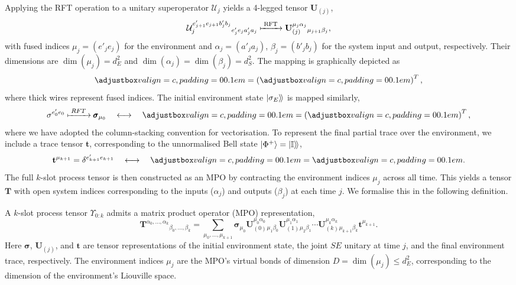 Applying the RFT operation to a unitary superoperator \(\mathcal{U}_j\) yields a 4-legged tensor \(\mathbf{U}_{(j)}\),
\begin{equation}
    \mathcal{U}_j^{e'_{j+1} e_{j+1} b'_j b_j}{}_{e'_j e_j a'_j a_j} \xmapsto{\;\mathrm{RFT}\;} \mathbf{U}_{(j)}^{\mu_j \alpha_j}{}_{\mu_{j+1} \beta_j},
\end{equation}
with fused indices \(\mu_j = (e'_j e_j)\) for the environment and \(\alpha_j=(a'_j a_j)\), \(\beta_j=(b'_j b_j)\) for the system input and output, respectively. Their dimensions are \(\dim(\mu_j) = d_E^2\) and \(\dim(\alpha_j) = \dim(\beta_j) = d_S^2\). The mapping is graphically depicted as
\begin{equation}
    \valignbox{}
    = 
    \left(\valignbox{}\right)^T,
\end{equation}
where thick wires represent fused indices. The initial environment state \(| \sigma_E \rangle \! \rangle\) is mapped similarly,
\begin{equation}
    \sigma^{e'_0e_0} \xmapsto {\;RFT\;} \pmb{\sigma}_{\mu_0} 
    \quad\longleftrightarrow\quad
    \valignbox{} = \left(\valignbox{}\right)^T,
\end{equation}
where we have adopted the column-stacking convention for vectorisation. To represent the final partial trace over the environment, we include a trace tensor \(\mathbf{t}\), corresponding to the unnormalised Bell state \(\ket{\Phi^+} = | \mathbb{I} \rangle \! \rangle\),
\begin{equation}
    \mathbf{t}^{\mu_{k+1}} = \delta^{e'_{k+1}e_{k+1}}
    \quad\longleftrightarrow\quad
    \valignbox{} = \valignbox{}.
\end{equation}
The full \(k\)-slot process tensor is then constructed as an MPO by contracting the environment indices \(\mu_j\) across all time. This yields a tensor \(\mathbf{T}\) with open system indices corresponding to the inputs (\(\alpha_j\)) and outputs (\(\beta_j\)) at each time \(j\). We formalise this in the following definition.
\begin{definition}\label{def:pt-mpo}
A $k$-slot process tensor $\Upsilon_{0:k}$ admits a matrix product operator (MPO) representation,
\begin{equation}\label{eq:pt-mpo}
    \mathbf{T}^{\alpha_0,\dots,\alpha_k}{}_{\beta_0,\dots,\beta_k} = \sum_{\mu_0,\dots,\mu_{k+1}} \pmb{\sigma}_{\mu_0}\mathbf{U}_{(0)}^{\mu_0\alpha_0}{}_{\mu_1\beta_0}\mathbf{U}_{(1)}^{\mu_1\alpha_1}{}_{\mu_2\beta_1}\cdots\mathbf{U}_{(k)}^{\mu_k\alpha_k}{}_{\mu_{k+1}\beta_k}\mathbf{t}^{\mu_{k+1}}.
\end{equation}
Here $\pmb{\sigma}$, $\mathbf{U}_{(j)}$, and $\mathbf{t}$ are tensor representations of the initial environment state, the joint $SE$ unitary at time $j$, and the final environment trace, respectively. The environment indices $\mu_j$ are the MPO's virtual bonds of dimension \(D = \dim{(\mu_j)} \le d_E^2\), corresponding to the dimension of the environment's Liouville space.
\end{definition}
